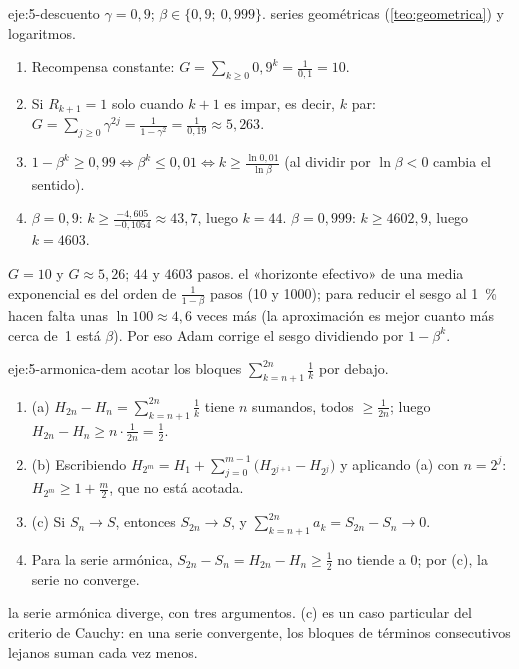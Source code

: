 \begin{solucion}{eje:5-descuento}
\datos $\gamma=0{,}9$; $\beta\in\{0{,}9;\ 0{,}999\}$.
\planteamiento series geométricas (\cref{teo:geometrica}) y logaritmos.
\pasos
\begin{enumerate}[label=\arabic*.]
  \item Recompensa constante: $G=\sum_{k\ge0}0{,}9^{k}=\frac{1}{0{,}1}=10$.
  \item Si $R_{k+1}=1$ solo cuando $k+1$ es impar, es decir, $k$ par: $G=\sum_{j\ge0}\gamma^{2j}=\frac{1}{1-\gamma^{2}}=\frac{1}{0{,}19}\approx5{,}263$.
  \item $1-\beta^{k}\ge0{,}99\iff\beta^{k}\le0{,}01\iff k\ge\frac{\ln0{,}01}{\ln\beta}$ (al dividir por $\ln\beta<0$ cambia el sentido).
  \item $\beta=0{,}9$: $k\ge\frac{-4{,}605}{-0{,}1054}\approx43{,}7$, luego $k=44$. $\beta=0{,}999$: $k\ge4602{,}9$, luego $k=4603$.
\end{enumerate}
\resultado $G=10$ y $G\approx5{,}26$; $44$ y $4603$ pasos.
\comprobacion el «horizonte efectivo» de una media exponencial es del orden de $\frac{1}{1-\beta}$ pasos (10 y 1000); para reducir el sesgo al 1~\% hacen falta unas $\ln100\approx4{,}6$ veces más (la aproximación es mejor cuanto más cerca de~1 está $\beta$). Por eso Adam corrige el sesgo dividiendo por $1-\beta^{k}$.
\end{solucion}

\begin{solucion}{eje:5-armonica-dem}
\planteamiento acotar los bloques $\sum_{k=n+1}^{2n}\frac1k$ por debajo.
\pasos
\begin{enumerate}[label=\arabic*.]
  \item (a) $H_{2n}-H_n=\sum_{k=n+1}^{2n}\frac1k$ tiene $n$ sumandos, todos $\ge\frac{1}{2n}$; luego $H_{2n}-H_n\ge n\cdot\frac{1}{2n}=\frac12$.
  \item (b) Escribiendo $H_{2^{m}}=H_1+\sum_{j=0}^{m-1}\bigl(H_{2^{j+1}}-H_{2^{j}}\bigr)$ y aplicando (a) con $n=2^{j}$: $H_{2^{m}}\ge1+\frac m2$, que no está acotada.
  \item (c) Si $S_n\to S$, entonces $S_{2n}\to S$, y $\sum_{k=n+1}^{2n}a_k=S_{2n}-S_n\to0$.
  \item Para la serie armónica, $S_{2n}-S_n=H_{2n}-H_n\ge\frac12$ no tiende a $0$; por (c), la serie no converge.
\end{enumerate}
\resultado la serie armónica diverge, con tres argumentos.
\comprobacion (c) es un caso particular del criterio de Cauchy: en una serie convergente, los bloques de términos consecutivos lejanos suman cada vez menos.
\end{solucion}

